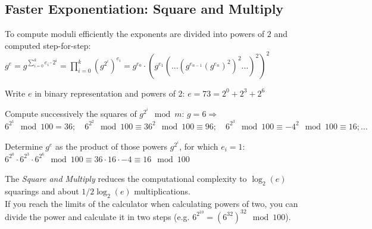 \subsection{Faster Exponentiation: Square and Multiply}
To compute moduli efficiently the exponents are divided into powers of $2$ and computed step-for-step:\\
$g^e=g^{\sum_{i=0}^k e_i \cdot 2^i}=\prod_{i=0}^k \left(g^{2^i}\right)^{e_i}=g^{e_0}\cdot\left(g^{e_1}\left(...\left(g^{e_{n-1}}\left(g^{e_n}\right)^2\right)^2...\right)^2\right)^2$
\begin{aufzaehlung}
	\item Write $e$ in binary representation and powers of 2: $e=73=2^0+2^3+2^6$
	\item Compute successively the squares of $g^{2^i} \mod m$: $g=6\Rightarrow$\\ 
		$6^{2^1} \mod 100 = 36;\quad 6^{2^2} \mod 100 \equiv 36^2  \mod 100 \equiv 96;\quad  6^{2^3} \mod 100 \equiv {-4}^2 \mod 100 \equiv 16; \ldots$
	\item Determine $g^e$ as the product of those powers $g^{2^i}$, for which $e_i = 1$: $6^{2^0}\cdot6^{2^3}\cdot6^{2^6}\mod 100\equiv 36 \cdot 16 \cdot -4 \equiv 16\mod 100$
\end{aufzaehlung}
The \textit{Square and Multiply} reduces the computational complexity to $\log_2(e)$ squarings and about $1/2 \log_2(e)$ multiplications.\\
If you reach the limits of the calculator when calculating powers of two, you can divide the power and calculate it in two steps (e.g. $6^{2^{10}}=(6^{32})^{32} \mod 100$).

